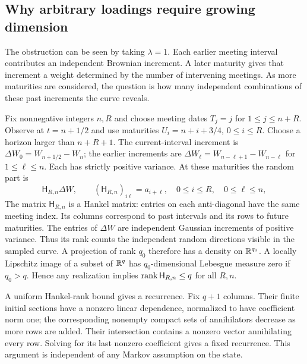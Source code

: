 \subsection{Why arbitrary loadings require growing dimension}
The obstruction can be seen by taking $\lambda=1$. Each earlier meeting interval contributes an independent Brownian increment. A later maturity gives that increment a weight determined by the number of intervening meetings. As more maturities are considered, the question is how many independent combinations of these past increments the curve reveals.

Fix nonnegative integers $n,R$ and choose meeting dates $T_j=j$ for $1\le j\le n+R$. Observe at $t=n+1/2$ and use maturities $U_i=n+i+3/4$, $0\le i\le R$. Choose a horizon larger than $n+R+1$. The current-interval increment is $\Delta W_0=W_{n+1/2}-W_n$; the earlier increments are $\Delta W_\ell=W_{n-\ell+1}-W_{n-\ell}$ for $1\le\ell\le n$. Each has strictly positive variance. At these maturities the random part is
\begin{equation}
\mathsf H_{R,n}\Delta W,\qquad (\mathsf H_{R,n})_{i\ell}=a_{i+\ell},\quad
0\le i\le R,\quad0\le\ell\le n,\label{eq:hankel}
\end{equation}
The matrix $\mathsf H_{R,n}$ is a Hankel matrix: entries on each anti-diagonal have the same meeting index. Its columns correspond to past intervals and its rows to future maturities. The entries of $\Delta W$ are independent Gaussian increments of positive variance. Thus its rank counts the independent random directions visible in the sampled curve. A projection of rank $q_0$ therefore has a density on $\mathbb R^{q_0}$. A locally Lipschitz image of a subset of $\mathbb R^q$ has $q_0$-dimensional Lebesgue measure zero if $q_0>q$. Hence any realization implies $\operatorname{rank} \mathsf H_{R,n}\le q$ for all $R,n$.

A uniform Hankel-rank bound gives a recurrence. Fix $q+1$ columns. Their finite initial sections have a nonzero linear dependence, normalized to have coefficient norm one; the corresponding nonempty compact sets of annihilators decrease as more rows are added. Their intersection contains a nonzero vector annihilating every row. Solving for its last nonzero coefficient gives a fixed recurrence. This argument is independent of any Markov assumption on the state.

